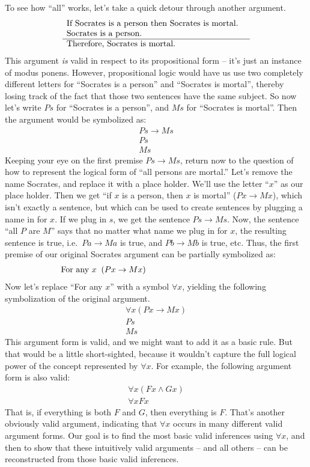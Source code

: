 To see how ``all'' works, let's take a quick detour through another
argument.  
\[ \begin{array}{p{7.5cm}}
  If Socrates is a person then Socrates is mortal. \\
  Socrates is a person. \\ \hline
  Therefore, Socrates is mortal. \end{array} \] 
This argument {\it is} valid in respect to its propositional form
-- it's just an instance of modus ponens.  However, propositional
logic would have us use two completely different letters for
``Socrates is a person'' and ``Socrates is mortal'', thereby losing
track of the fact that those two sentences have the same subject.  So
now let's write $Ps$ for ``Socrates is a person'', and $Ms$ for
``Socrates is mortal''.  Then the argument would be symbolized as:
\[ \begin{array}{l}
Ps\to Ms \\
Ps \\ \hline 
Ms \end{array} \] 
Keeping your eye on the first premise $Ps\to Ms$, return now to the
question of how to represent the logical form of ``all persons are mortal.''
Let's remove the name Socrates, and replace it with a
place holder.  We'll use the letter ``$x$'' as our place holder.  Then
we get ``if $x$ is a person, then $x$ is mortal'' ($Px\to Mx$), which isn't exactly
a sentence, but which can be used to create sentences by plugging a
name in for $x$.  If we plug in $s$, we get the sentence $Ps\to Ms$.
Now, the sentence ``all $P$ are $M$'' says that no matter what name we
plug in for $x$, the resulting sentence is true, i.e.\ $Pa\to Ma$ is
true, and $Pb\to Mb$ is true, etc.  Thus, the first premise of our
original Socrates argument can be partially symbolized as:
\[ \begin{array}{p{8cm}}
     For any $x\:$ $(Px\to Mx)$ \end{array} \]
Now let's replace ``For any $x$'' with a symbol $\forall x$, yielding
the following symbolization of the original argument.
\[ \begin{array}{l}
     \forall x(Px\to Mx) \\
     Ps \\ \hline Ms \end{array} \] This argument form is valid, and we might want to add it as a
 basic rule.  But that would be a little short-sighted, because it
 wouldn't capture the full logical power of the concept represented by
 $\forall x$.  For example, the following argument form is also valid:
 \[ \begin{array}{l} \forall x(Fx\wedge Gx) \\ \hline \forall
     xFx \end{array} \] That is, if everything is both $F$ and $G$,
 then everything is $F$.  That's another obviously valid argument,
 indicating that $\forall x$ occurs in many different valid argument
 forms.  Our goal is to find the most basic valid inferences using
 $\forall x$, and then to show that these intuitively valid arguments
 -- and all others -- can be reconstructed from those basic valid
 inferences.

